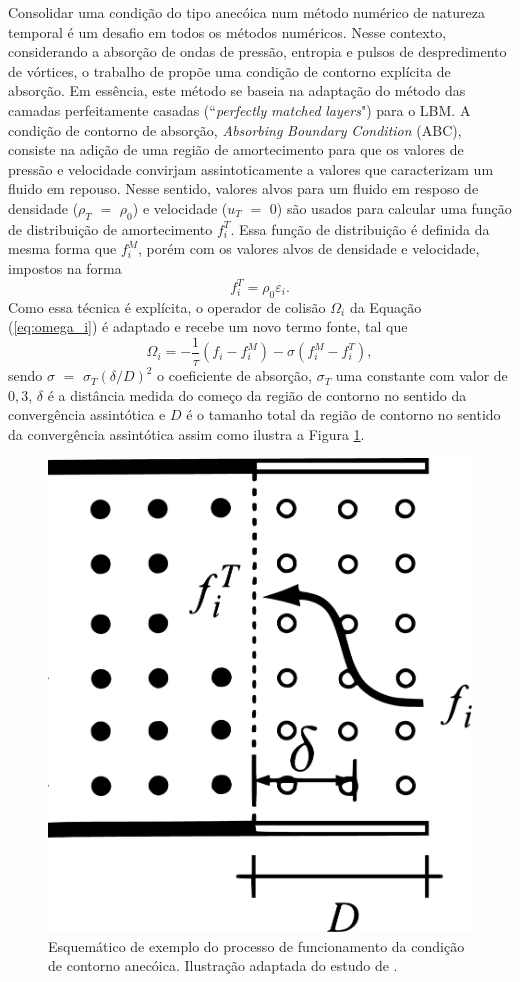 Consolidar uma condição do tipo anecóica num método numérico de natureza temporal é um desafio em todos os métodos numéricos. Nesse contexto, considerando a absorção de ondas de pressão, entropia e pulsos de despredimento de vórtices, o trabalho de  propõe uma condição de contorno explícita de absorção. Em essência, este método se baseia na adaptação do método das camadas perfeitamente casadas (``\textit{perfectly} \textit{matched} \textit{layers}") para o LBM. A condição de contorno de absorção, \textit{Absorbing} \textit{Boundary} \textit{Condition} (ABC), consiste na adição de uma região de amortecimento para que os valores de pressão e velocidade convirjam assintoticamente a valores que caracterizam um fluido em repouso. Nesse sentido, valores alvos para um fluido em resposo de densidade ($\rho_{T}$ $=$ $\rho_{0}$) e velocidade (\textbf{$u_{T}$} $=$ $0$) são usados para calcular uma função de distribuição de amortecimento $f_{i}^{T}$. Essa função de distribuição é definida da mesma forma que $f_{i}^{M}$, porém com os valores alvos de densidade e velocidade, impostos na forma
\begin{equation}
  f_{i}^{T} = \rho_{0}\varepsilon_{i}.
  \label{eq:f_alvo}
\end{equation}
Como essa técnica é explícita, o operador de colisão $\Omega_{i}$ da Equação (\ref{eq:omega_i}) é adaptado e recebe um novo termo fonte, tal que
\begin{equation}
  \Omega_{i} = -\frac{1}{\tau}(f_{i} - f_{i}^{M}) - \sigma(f_{i}^{M} - f_{i}^{T}),
  \label{eq:omega_i_abc}
\end{equation}
sendo $\sigma$ $=$ $\sigma_{T}(\delta/D)^{2}$ o coeficiente de absorção, $\sigma_{T}$ uma constante com valor de $0,3$, $\delta$ é a distância medida do começo da região de contorno no sentido da convergência assintótica e $D$ é o tamanho total da região de contorno no sentido da convergência assintótica assim como ilustra a Figura \ref{fig:abc}.

\begin{figure}[ht!]
\centering
  \includegraphics[width=.3\linewidth]{figuras/abc.pdf}
  \caption[Funcionamento da condição de contorno anecóica]{Esquemático de exemplo do processo de funcionamento da condição de contorno anecóica. Ilustração adaptada do estudo de .}
  \label{fig:abc}
\end{figure}

